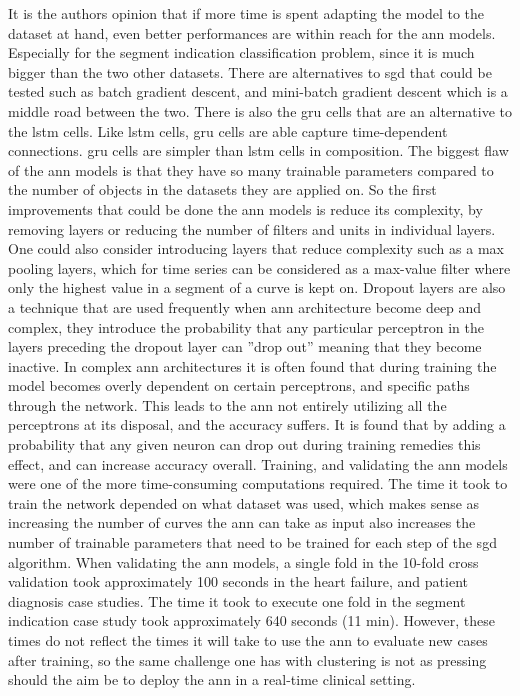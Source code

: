 It is the authors opinion that if more time is spent adapting the model to the dataset at hand, even better performances are within reach for the \acrshort{ann} models. Especially for the segment indication classification problem, since it is much bigger than the two other datasets. There are alternatives to \acrshort{sgd} that could be tested such as batch gradient descent, and mini-batch gradient descent which is a middle road between the two. There is also the \acrfull{gru} cells that are an alternative to the \acrshort{lstm} cells. Like \acrshort{lstm} cells, \acrshort{gru} cells are able capture time-dependent connections. \acrshort{gru} cells are simpler than \acrshort{lstm} cells in composition. The biggest flaw of the \acrshort{ann} models is that they have so many trainable parameters compared to the number of objects in the datasets they are applied on. So the first improvements that could be done the \acrshort{ann} models is reduce its complexity, by removing layers or reducing the number of filters and units in individual layers. One could also consider introducing layers that reduce complexity such as a max pooling layers, which for time series can be considered as a max-value filter where only the highest value in a segment of a curve is kept on. Dropout layers are also a technique that are used frequently when \acrshort{ann} architecture become deep and complex, they introduce the probability that any particular perceptron in the layers preceding the dropout layer can ''drop out'' meaning that they become inactive. In complex \acrshort{ann} architectures it is often found that during training the model becomes overly dependent on certain perceptrons, and specific paths through the network. This leads to the \acrshort{ann} not entirely utilizing all the perceptrons at its disposal, and the accuracy suffers. It is found that by adding a probability that any given neuron can drop out during training remedies this effect, and can increase accuracy overall. \bigskip
Training, and validating the \acrshort{ann} models were one of the more time-consuming computations required. The time it took to train the network depended on what dataset was used, which makes sense as increasing the number of curves the \acrshort{ann} can take as input also increases the number of trainable parameters that need to be trained for each step of the \acrshort{sgd} algorithm. When validating the \acrshort{ann} models, a single fold in the 10-fold cross validation took approximately 100 seconds in the heart failure, and patient diagnosis case studies. The time it took to execute one fold in the segment indication case study took approximately 640 seconds (11 min). However, these times do not reflect the times it will take to use the \acrshort{ann} to evaluate new cases after training, so the same challenge one has with clustering is not as pressing should the aim be to deploy the \acrshort{ann} in a real-time clinical setting.

